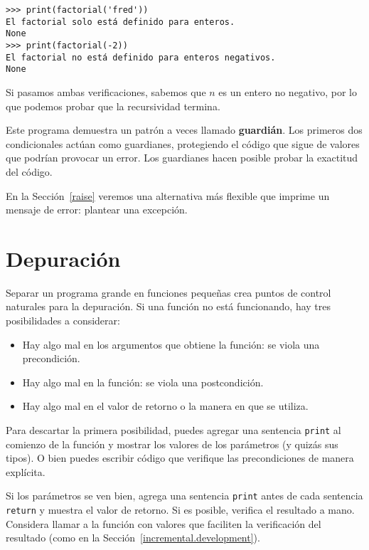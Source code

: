 \documentclass[10pt]{book}
\begin{document}
\begin{verbatim}
>>> print(factorial('fred'))
El factorial solo está definido para enteros.
None
>>> print(factorial(-2))
El factorial no está definido para enteros negativos.
None
\end{verbatim}
%
Si pasamos ambas verificaciones, sabemos que $n$ es un entero no negativo, por lo que podemos probar que la recursividad termina.

Este programa demuestra un patrón a veces llamado {\bf guardián}.
Los primeros dos condicionales actúan como guardianes, protegiendo el código que
sigue de valores que podrían provocar un error.  Los guardianes hacen
posible probar la exactitud del código.

En la Sección~\ref{raise} veremos una alternativa más flexible que imprime
un mensaje de error: plantear una excepción.


\section{Depuración}
\label{factdebug}

Separar un programa grande en funciones pequeñas crea puntos de control
naturales para la depuración.  Si una función no está
funcionando, hay tres posibilidades a considerar:

\begin{itemize}

\item Hay algo mal en los argumentos que obtiene
la función: se viola una precondición.

\item Hay algo mal en la función: se viola una
postcondición.

\item Hay algo mal en el valor de retorno o la
manera en que se utiliza.

\end{itemize}

Para descartar la primera posibilidad, puedes agregar una sentencia {\tt print}
al comienzo de la función y mostrar los valores de los
parámetros (y quizás sus tipos).  O bien puedes escribir código
que verifique las precondiciones de manera explícita.

Si los parámetros se ven bien, agrega una sentencia {\tt print} antes de cada
sentencia {\tt return} y muestra el valor de retorno.  Si es
posible, verifica el resultado a mano.  Considera llamar a la
función con valores que faciliten la verificación del resultado
(como en la Sección~\ref{incremental.development}).
\end{document}
